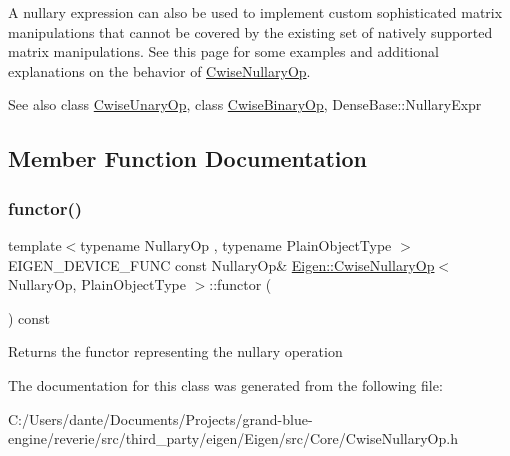 A nullary expression can also be used to implement custom sophisticated matrix manipulations that cannot be covered by the existing set of natively supported matrix manipulations. See this page for some examples and additional explanations on the behavior of \mbox{\hyperlink{class_eigen_1_1_cwise_nullary_op}{Cwise\+Nullary\+Op}}.

\begin{DoxySeeAlso}{See also}
class \mbox{\hyperlink{class_eigen_1_1_cwise_unary_op}{Cwise\+Unary\+Op}}, class \mbox{\hyperlink{class_eigen_1_1_cwise_binary_op}{Cwise\+Binary\+Op}}, Dense\+Base\+::\+Nullary\+Expr 
\end{DoxySeeAlso}


\subsection{Member Function Documentation}
\mbox{\label{class_eigen_1_1_cwise_nullary_op_abef8b2e7bcbcfa98c49caf0a1391ee47}} 
\subsubsection{\texorpdfstring{functor()}{functor()}}
{\footnotesize\ttfamily template$<$typename Nullary\+Op , typename Plain\+Object\+Type $>$ \\
E\+I\+G\+E\+N\+\_\+\+D\+E\+V\+I\+C\+E\+\_\+\+F\+U\+NC const Nullary\+Op\& \mbox{\hyperlink{class_eigen_1_1_cwise_nullary_op}{Eigen\+::\+Cwise\+Nullary\+Op}}$<$ Nullary\+Op, Plain\+Object\+Type $>$\+::functor (\begin{DoxyParamCaption}{ }\end{DoxyParamCaption}) const\hspace{0.3cm}{\ttfamily [inline]}}

\begin{DoxyReturn}{Returns}
the functor representing the nullary operation 
\end{DoxyReturn}


The documentation for this class was generated from the following file\+:\begin{DoxyCompactItemize}
\item 
C\+:/\+Users/dante/\+Documents/\+Projects/grand-\/blue-\/engine/reverie/src/third\+\_\+party/eigen/\+Eigen/src/\+Core/Cwise\+Nullary\+Op.\+h\end{DoxyCompactItemize}
